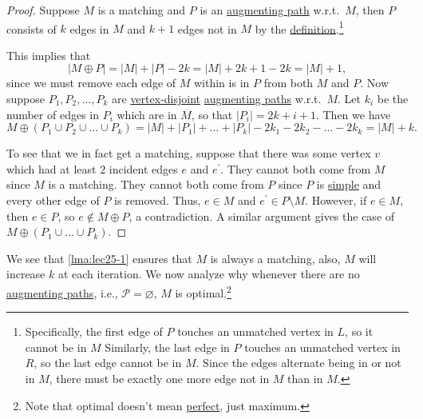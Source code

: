 \begin{proof}
	Suppose \(M\) is a matching and \(P\) is an \hyperref[def:augmenting-path]{augmenting path} w.r.t.\ \(M\), then \(P\) consists of \(k\) edges in \(M\) and \(k+1\) edges not in \(M\) by the \hyperref[def:augmenting-path]{definition}.\footnote{Specifically, the first edge of \(P\) touches an unmatched vertex in \(L\), so it cannot be in \(M\) Similarly, the last edge in \(P\) touches an unmatched vertex in \(R\), so the last edge cannot be in \(M\). Since the edges alternate being in or not in \(M\), there must be exactly one more edge not in \(M\) than in \(M\).}

	This implies that
	\[
		\left\vert M\oplus P \right\vert = \left\vert M \right\vert + \left\vert P \right\vert - 2k = \left\vert M \right\vert + 2k + 1 - 2k = \left\vert M \right\vert + 1,
	\]
	since we must remove each edge of \(M\) within is in \(P\) from both \(M\) and \(P\). Now suppose \(P_1, P_2, \dots  , P_k\) are \hyperref[def:vertex-independent]{vertex-disjoint} \hyperref[def:augmenting-path]{augmenting paths} w.r.t.\ \(M\). Let \(k_i\) be the number of edges in \(P_{i} \) which are in \(M\), so that \(\left\vert P_{i}  \right\vert = 2k + i + 1\). Then we have
	\[
		M \oplus (P_1 \cup P_2 \cup  \dots  \cup P_k)= \left\vert M \right\vert + \left\vert P_1 \right\vert + \dots  + \left\vert P_k \right\vert
		- 2k_1 - 2k_2 - \dots  - 2k_k = \left\vert M \right\vert + k.
	\]

	To see that we in fact get a matching, suppose that there was some vertex \(v\) which had at least \(2\) incident edges \(e\) and \(e^\prime \). They cannot both come from \(M\) since \(M\) is a matching. They cannot both come from \(P\) since \(P\) is \hyperref[def:simple-path]{simple} and every other edge of \(P\) is removed. Thus, \(e\in M\) and \(e^\prime \in P\setminus M\). However, if \(e\in M\), then \(e\in P\), so \(e \notin M\oplus P\), a contradiction. A similar argument gives the case of \(M\oplus (P_1 \cup \dots \cup P_k )\).
\end{proof}

We see that \autoref{lma:lec25-1} ensures that \(M\) is always a matching, also, \(M\) will increase \(k\) at each iteration. We now analyze why whenever there are no \hyperref[def:augmenting-path]{augmenting paths}, i.e., \(\mathcal{P} = \varnothing \), \(M\) is optimal.\footnote{Note that optimal doesn't mean \hyperref[def:perfect-matching]{perfect}, just maximum.}

